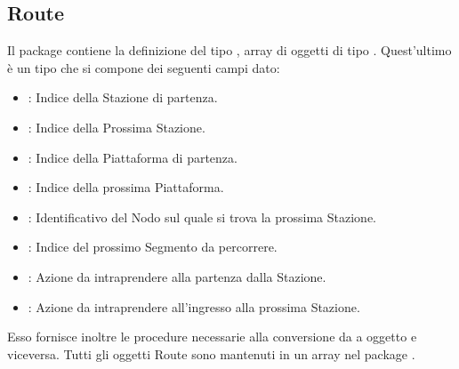 	\subsection{Route}
	
	Il package  contiene la definizione del tipo , array di oggetti di tipo . Quest'ultimo è un tipo  che si compone dei seguenti campi dato:
	\begin{itemize}
		\item {}: Indice della Stazione di partenza.
		\item {}: Indice della Prossima Stazione.
		\item {}: Indice della Piattaforma di partenza.
		\item {}: Indice della prossima Piattaforma.
        \item {}: Identificativo del Nodo sul quale si trova la prossima Stazione.
        \item {}: Indice del prossimo Segmento da percorrere.
		\item {}: Azione da intraprendere alla partenza dalla Stazione.
		\item {}: Azione da intraprendere all'ingresso alla prossima Stazione.
	\end{itemize}
	
	Esso fornisce inoltre le procedure necessarie alla conversione da  a oggetto  e viceversa. Tutti gli oggetti Route sono mantenuti in un array nel package .
